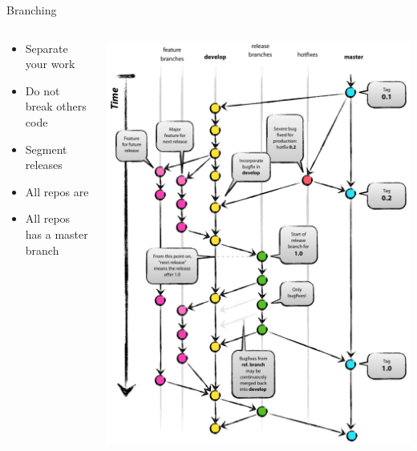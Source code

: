 \documentclass[table,svgnames,aspectratio=169]{beamer}
\begin{document}
\begin{frame}[label={sec:orgf19e270}]{Branching}
\begin{columns}
\begin{column}{.5\columnwidth}
\begin{itemize}
\item Separate your work
\item Do not break others code
\item Segment releases
\item All repos are
\item All repos has a master branch
\end{itemize}
\end{column}
\begin{column}{.5\columnwidth}
\begin{center}
\includegraphics[width=.75\textwidth]{graphics/git-model.png}
\end{center}
\end{column}
\end{columns}
\end{frame}
\end{document}
